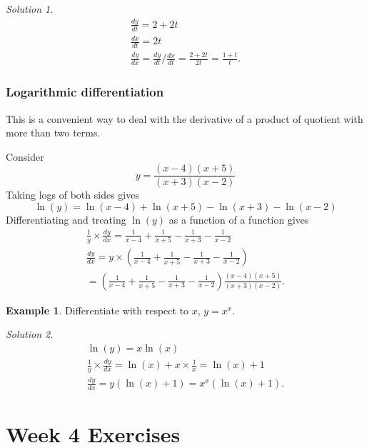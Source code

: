 \documentclass[
  11pt,
  oneside]{book}
\newcommand{\slide}{}
\theoremstyle{definition}
\theoremstyle{definition}
\newtheorem{example}{Example}[chapter]
\theoremstyle{definition}
\theoremstyle{definition}
\theoremstyle{remark}
\newtheorem*{solution}{Solution}
\begin{document}
\begin{solution}
\begin{gather*}
\frac{dy}{dt} = 2+2t\\
\frac{dx}{dt} = 2t\\
\frac{dy}{dx} = \frac{dy}{dt}/\frac{dx}{dt} = \frac{2+2t}{2t} = \frac{1+t}{t}.
\end{gather*}
\end{solution}

\slide

\subsection{Logarithmic differentiation}\label{logarithmic-differentiation}

This is a convenient way to deal with the derivative of a product of quotient with more than two terms.

Consider
\[
y = \frac{(x-4)(x+5)}{(x+3)(x-2)}
\]
Taking logs of both sides gives
\[
\ln(y) = \ln(x-4)+\ln(x+5)-\ln(x+3)-\ln(x-2)
\]
Differentiating and treating \(\ln(y)\) as a function of a function gives
\begin{gather*}
\frac 1y\times\frac{dy}{dx} = \frac{1}{x-4}+\frac{1}{x+5}-\frac{1}{x+3}-\frac{1}{x-2}\\
\frac{dy}{dx} = y\times\left(\frac{1}{x-4}+\frac{1}{x+5}-\frac{1}{x+3}-\frac{1}{x-2}\right)\\
= \left(\frac{1}{x-4}+\frac{1}{x+5}-\frac{1}{x+3}-\frac{1}{x-2}\right)\frac{(x-4)(x+5)}{(x+3)(x-2)}.
\end{gather*}

\begin{example}
Differentiate with respect to \(x\), \(y=x^x\).
\end{example}

\begin{solution}
\begin{gather*}
\ln(y) = x\ln(x)\\
\frac{1}{y}\times\frac{dy}{dx} = \ln(x)+x\times\frac{1}{x} = \ln(x)+1\\
\frac{dy}{dx} = y(\ln(x)+1) = x^x(\ln(x)+1).
\end{gather*}
\end{solution}

\chapter*{Week 4 Exercises}\label{week-4-exercises}
\end{document}
